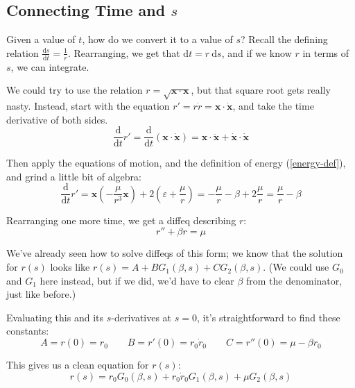 \documentclass{article}
\newcommand{\dd}{\mathrm{d}}
\newcommand{\der}[2]{\frac{\dd #1}{\dd #2}}
\numberwithin{equation}{subsection}
\begin{document}
\subsection{Connecting Time and \texorpdfstring{$s$}{s}}

Given a value of $t$, how do we convert it to a value of $s$? Recall the defining relation $\der{s}{t} = \frac{1}{r}$. Rearranging, we get that $\dd t = r~\dd s$, and if we know $r$ in terms of $s$, we can integrate.

We could try to use the relation $r = \sqrt{\bm x \cdot \bm x}$, but that square root gets really nasty. Instead, start with the equation $r' = r \dot{r} = \bm x \cdot \dot{\bm x}$, and take the time derivative of both sides.
\begin{equation*}
\der{}{t} r' = \der{}{t} (\bm x \cdot \dot{\bm x}) = \bm x \cdot \bm{\ddot x} + \bm{\dot x} \cdot \bm{\dot x}
\end{equation*}

Then apply the equations of motion, and the definition of energy (\ref{energy-def}), and grind a little bit of algebra:
\begin{equation*}
\der{}{t} r' = \bm x \left( - \frac{\mu}{r^3} \bm x \right) + 2 \left( \varepsilon + \frac{\mu}{r} \right) = - \frac{\mu}{r} - \beta + 2 \frac{\mu}{r} = \frac{\mu}{r} - \beta 
\end{equation*}

Rearranging one more time, we get a diffeq describing $r$:
\begin{equation}
r'' + \beta r = \mu
\end{equation}

We've already seen how to solve diffeqs of this form; we know that the solution for $r(s)$ looks like $r(s) = A + B G_1(\beta, s) + C G_2(\beta, s)$. (We could use $G_0$ and $G_1$ here instead, but if we did, we'd have to clear $\beta$ from the denominator, just like before.)

Evaluating this and its $s$-derivatives at $s = 0$, it's straightforward to find these constants:
\begin{equation}
A = r(0) = r_0 \qquad B = r'(0) = r_0 \dot{r}_0 \qquad C = r''(0) = \mu - \beta r_0
\end{equation}

This gives us a clean equation for $r(s)$:
\begin{equation}
\label{solution-for-r}
r(s) = r_0 G_0(\beta, s) + r_0 \dot{r}_0 G_1(\beta, s) + \mu G_2(\beta, s)
\end{equation}
\end{document}
